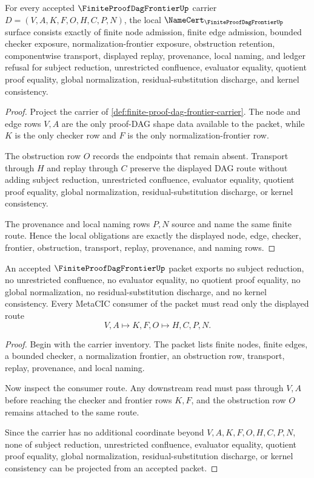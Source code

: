 \begin{theorem}
\label{thm:finite-proof-dag-frontier-namecert-obligations}
For every accepted $\FiniteProofDagFrontierUp$ carrier $D=(V,A,K,F,O,H,C,P,N)$, the local $\NameCert_{\FiniteProofDagFrontierUp}$ surface consists exactly of finite node admission, finite edge admission, bounded checker exposure, normalization-frontier exposure, obstruction retention, componentwise transport, displayed replay, provenance, local naming, and ledger refusal for subject reduction, unrestricted confluence, evaluator equality, quotient proof equality, global normalization, residual-substitution discharge, and kernel consistency.
\end{theorem}
\begin{proof}
Project the carrier of \autoref{def:finite-proof-dag-frontier-carrier}. The node and edge rows $V,A$ are the only proof-DAG shape data available to the packet, while $K$ is the only checker row and $F$ is the only normalization-frontier row.

The obstruction row $O$ records the endpoints that remain absent. Transport through $H$ and replay through $C$ preserve the displayed DAG route without adding subject reduction, unrestricted confluence, evaluator equality, quotient proof equality, global normalization, residual-substitution discharge, or kernel consistency.

The provenance and local naming rows $P,N$ source and name the same finite route. Hence the local obligations are exactly the displayed node, edge, checker, frontier, obstruction, transport, replay, provenance, and naming rows.
\end{proof}

\begin{theorem}
\label{thm:finite-proof-dag-frontier-nonescape}
An accepted $\FiniteProofDagFrontierUp$ packet exports no subject reduction, no unrestricted confluence, no evaluator equality, no quotient proof equality, no global normalization, no residual-substitution discharge, and no kernel consistency. Every MetaCIC consumer of the packet must read only the displayed route
$$
V,A \longmapsto K,F,O \longmapsto H,C,P,N .
$$
\end{theorem}
\begin{proof}
Begin with the carrier inventory. The packet lists finite nodes, finite edges, a bounded checker, a normalization frontier, an obstruction row, transport, replay, provenance, and local naming.

Now inspect the consumer route. Any downstream read must pass through $V,A$ before reaching the checker and frontier rows $K,F$, and the obstruction row $O$ remains attached to the same route.

Since the carrier has no additional coordinate beyond $V,A,K,F,O,H,C,P,N$, none of subject reduction, unrestricted confluence, evaluator equality, quotient proof equality, global normalization, residual-substitution discharge, or kernel consistency can be projected from an accepted packet.
\end{proof}

